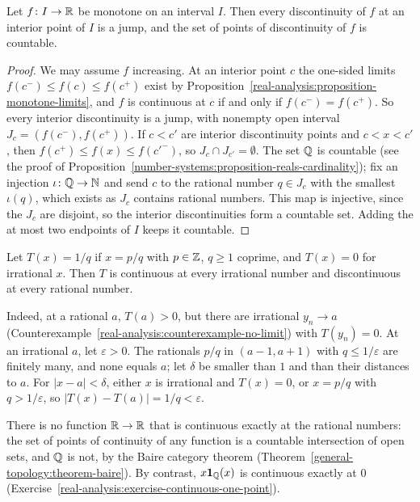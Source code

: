 \begin{theorem}\label{real-analysis:theorem-monotone-discontinuities}
Let $f \colon I \to \mathbb{R}$ be monotone on an interval $I$. Then every discontinuity of $f$ at an interior point of $I$ is a jump, and the set of points of discontinuity of $f$ is countable.
\end{theorem}

\begin{proof}
We may assume $f$ increasing. At an interior point $c$ the one-sided limits $f(c^-) \leq f(c) \leq f(c^+)$ exist by Proposition~\ref{real-analysis:proposition-monotone-limits}, and $f$ is continuous at $c$ if and only if
$f(c^-) = f(c^+)$. So every interior discontinuity is a jump, with nonempty open interval $J_c = (f(c^-), f(c^+))$. If $c < c'$ are interior discontinuity points and $c < x < c'$, then
$f(c^+) \leq f(x) \leq f(c'^-)$, so $J_c \cap J_{c'} = \emptyset$. The set $\mathbb{Q}$ is countable (see the proof of Proposition~\ref{number-systems:proposition-reals-cardinality}); fix an injection
$\iota \colon \mathbb{Q} \to \mathbb{N}$ and send $c$ to the rational number $q \in J_c$ with the smallest $\iota(q)$, which exists as $J_c$ contains rational numbers. This map is injective, since the $J_c$ are disjoint, so
the interior discontinuities form a countable set. Adding the at most two endpoints of $I$ keeps it countable.
\end{proof}

\begin{example}\label{real-analysis:example-thomae}
Let $T(x) = 1/q$ if $x = p/q$ with $p \in \mathbb{Z}$, $q \geq 1$ coprime, and $T(x) = 0$ for irrational $x$. Then $T$ is continuous at every irrational number and discontinuous at every rational number.

Indeed, at a rational $a$, $T(a) > 0$, but there are irrational $y_n \to a$ (Counterexample~\ref{real-analysis:counterexample-no-limit}) with $T(y_n) = 0$. At an irrational $a$, let $\varepsilon > 0$. The rationals
$p/q$ in $(a - 1, a + 1)$ with $q \leq 1/\varepsilon$ are finitely many, and none equals $a$; let $\delta$ be smaller than $1$ and than their distances to $a$. For $|x - a| < \delta$, either $x$ is irrational and $T(x) = 0$,
or $x = p/q$ with $q > 1/\varepsilon$, so $|T(x) - T(a)| = 1/q < \varepsilon$.
\end{example}

\begin{remark}\label{real-analysis:remark-continuity-set}
There is no function $\mathbb{R} \to \mathbb{R}$ that is continuous exactly at the rational numbers: the set of points of continuity of any function is a countable intersection of open sets, and $\mathbb{Q}$ is not, by the
Baire category theorem (Theorem~\ref{general-topology:theorem-baire}). By contrast, $x\mathbf{1}_{\mathbb{Q}}(x)$ is continuous exactly at $0$ (Exercise~\ref{real-analysis:exercise-continuous-one-point}).
\end{remark}

